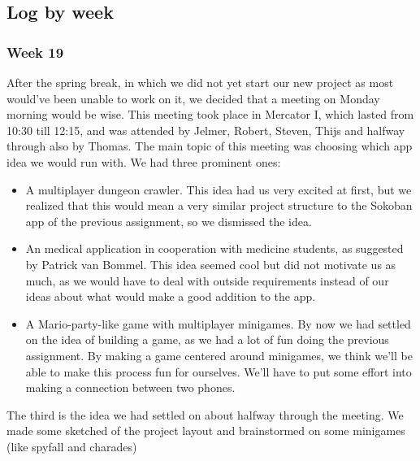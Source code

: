 \documentclass[../main.tex]{subfiles}
\begin{document}
\pagebreak
\subsection{Log by week}
\subsubsection*{Week 19}
After the spring break, in which we did not yet start our new project as most would've been unable to work on it, we decided that a meeting on Monday morning would be wise. This meeting took place in Mercator I, which lasted from 10:30 till 12:15, and was attended by Jelmer, Robert, Steven, Thijs and halfway through also by Thomas.
The main topic of this meeting was choosing which app idea we would run with. We had three prominent ones:
\begin{itemize}
	\item A multiplayer dungeon crawler. This idea had us very excited at first, but we realized that this would mean a very similar project structure to the Sokoban app of the previous assignment, so we dismissed the idea.
	\item An medical application in cooperation with medicine students, as suggested by Patrick van Bommel. This idea seemed cool but did not motivate us as much, as we would have to deal with outside requirements instead of our ideas about what would make a good addition to the app.
	\item A Mario-party-like game with multiplayer minigames. By now we had settled on the idea of building a game, as we had a lot of fun doing the previous assignment. By making a game centered around minigames, we think we'll be able to make this process fun for ourselves. We'll have to put some effort into making a connection between two phones.
\end{itemize}

The third is the idea we had settled on about halfway through the meeting. We made some sketched of the project layout and brainstormed on some minigames (like spyfall and charades)
\end{document}
